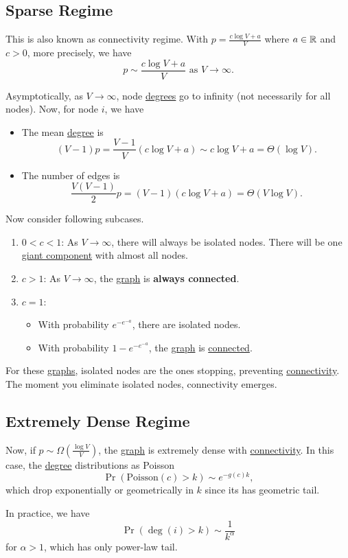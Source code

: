 \subsection{Sparse Regime}\label{subsec:sparse-regime}
This is also known as connectivity regime. With \(p = \frac{c\log V + a}{V}\) where \(a\in\mathbb{\MakeUppercase{R}}\) and \(c>0\),
more precisely, we have
\[
	p\sim \frac{c\log V + a}{V} \text{ as }V\to \infty.
\]

Asymptotically, as \(V\to \infty \), node \hyperref[def:degree]{degrees} go to infinity (not necessarily for all nodes). Now, for node \(i\), we have
\begin{itemize}
	\item The mean \hyperref[def:degree]{degree} is
	      \[
		      (V - 1)p = \frac{V-1}{V}(c\log V + a)\sim c\log V + a = \Theta(\log V).
	      \]
	\item The number of edges is
	      \[
		      \frac{V(V-1)}{2}p = (V - 1)(c\log V + a) = \Theta(V\log V).
	      \]
\end{itemize}

\begin{remark}
	Now consider following subcases.
	\begin{enumerate}
		\item \(0<c<1\): As \(V\to \infty \), there will always be isolated nodes. There will be one \hyperref[def:giant-component]{giant component} with almost all nodes.
		\item \(c>1\): As \(V\to \infty \), the \hyperref[def:graph]{graph} is \textbf{always connected}.
		\item \(c = 1\):
		      \begin{itemize}
			      \item With probability \(e^{-e^{-a}}\), there are isolated nodes.
			      \item With probability \(1 - e^{-e^{-a}}\), the \hyperref[def:graph]{graph} is \hyperref[def:connected]{connected}.
		      \end{itemize}
	\end{enumerate}
	For these \hyperref[def:graph]{graphs}, isolated nodes are the ones stopping, preventing \hyperref[def:connected]{connectivity}.
	The moment you eliminate isolated nodes, connectivity emerges.
\end{remark}

\subsection{Extremely Dense Regime}\label{subsec:extremely-dense-regime}
Now, if \(p\sim \Omega(\frac{\log V}{V})\), the \hyperref[def:graph]{graph} is extremely dense with \hyperref[def:connected]{connectivity}. In this case,
the \hyperref[def:degree]{degree} distributions as Poisson
\[
	\Pr(\mathrm{Poisson}(c) > k) \sim e^{-g(c)k},
\]
which drop exponentially or geometrically in \(k\) since its has geometric tail.
\begin{remark}
	In practice, we have
	\[
		\Pr(\deg(i) > k) \sim \frac{1}{k^\alpha }
	\]
	for \(\alpha > 1\), which has only power-law tail.
\end{remark}